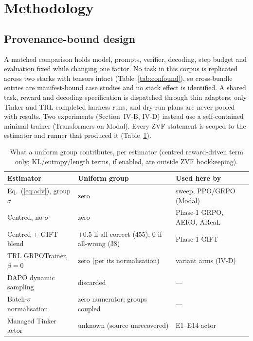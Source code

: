 \documentclass[conference]{IEEEtran}
\begin{document}
\section{Methodology}

\subsection{Provenance-bound design}
A matched comparison holds model, prompts, verifier, decoding, step budget
and evaluation fixed while changing one factor. No task in this corpus is
replicated across two stacks with tensors intact (Table~\ref{tab:confound}),
so cross-bundle entries are manifest-bound case studies and no stack effect
is identified. A shared task, reward and decoding specification is
dispatched through thin adapters; only Tinker and TRL completed harness runs,
and dry-run plans are never pooled with results. Two experiments
(Section~IV-B, IV-D) instead use a self-contained minimal trainer
(Transformers on Modal). Every ZVF statement is scoped to the estimator and
runner that produced it (Table~\ref{tab:est}).

\begin{table}[t]
\caption{What a uniform group contributes, per estimator (centred
reward-driven term only; KL/entropy/length terms, if enabled, are outside
ZVF bookkeeping).}
\label{tab:est}
\centering
\footnotesize
\setlength{\tabcolsep}{2.5pt}
\begin{tabular}{@{}p{2.5cm}p{2.5cm}p{2.85cm}@{}}
\toprule
Estimator & Uniform group & Used here by \\
\midrule
Eq.~(\ref{eq:adv}), group $\sigma$ & zero & sweep, PPO/GRPO (Modal) \\
Centred, no $\sigma$ & zero & Phase-1 GRPO, AERO, AReaL \\
Centred + GIFT blend & $+0.5$ if all-correct (455), 0 if all-wrong (38) & Phase-1 GIFT \\
TRL GRPOTrainer, $\beta=0$ & zero (per its normalisation) & variant arms (IV-D) \\
DAPO dynamic sampling & discarded & --- \\
Batch-$\sigma$ normalisation & zero numerator; groups coupled & --- \\
Managed Tinker actor & unknown (source unrecovered) & E1--E14 actor \\
\bottomrule
\end{tabular}
\end{table}
\end{document}
